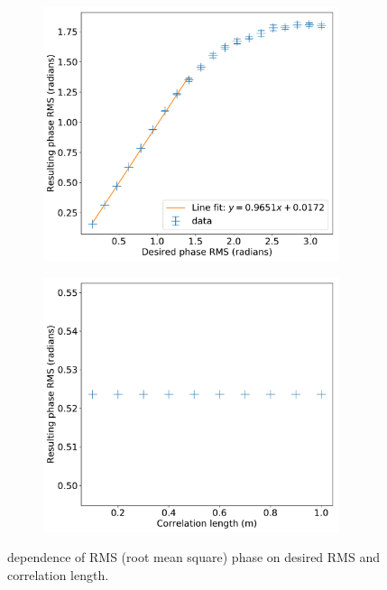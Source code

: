\documentclass[11pt]{article}
\begin{document}
\begin{figure}
    \centering
    \begin{subfigure}{0.5\textwidth}
        \centering
        \includegraphics[width=0.95\textwidth]{pictures/rmstest/depth}
        \caption{}\label{fig:rms:depth}
    \end{subfigure}%
    \begin{subfigure}{0.5\textwidth}
        \centering
        \includegraphics[width=0.95\textwidth]{pictures/rmstest/l_corr}
        \caption{}\label{fig:rms:length}
    \end{subfigure}
    \caption{dependence of RMS (root mean square) phase on desired RMS and correlation length.}\label{fig:rms}
\end{figure}
\end{document}

